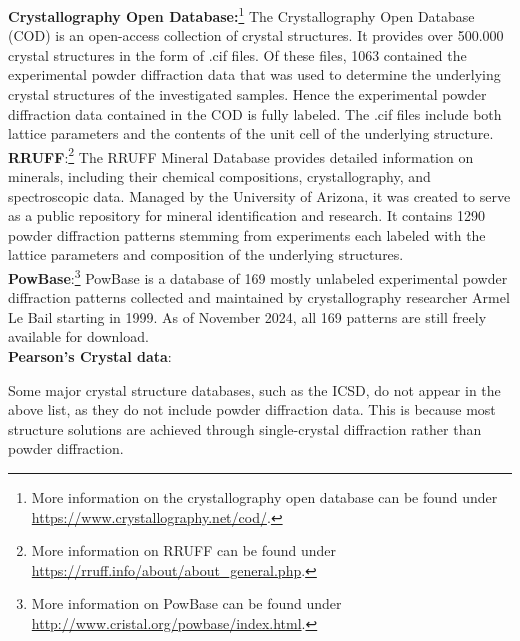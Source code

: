 \textbf{Crystallography Open Database:}\footnote{More information on the crystallography open database can be found under \url{https://www.crystallography.net/cod/}.} The Crystallography Open Database (COD)\cite{Graulis2009cod} is an open-access collection of crystal structures. It provides over 500.000 crystal structures in the form of .cif files. Of these files, 1063 contained the experimental powder diffraction data that was used to determine the underlying crystal structures of the investigated samples. Hence the experimental powder diffraction data contained in the COD is fully labeled. The .cif files include both lattice parameters and the contents of the unit cell of the underlying structure. \\

\textbf{RRUFF}:\footnote{More information on RRUFF can be found under \url{https://rruff.info/about/about_general.php}.} The RRUFF Mineral Database \cite{Armbruster2015} provides detailed information on minerals, including their chemical compositions, crystallography, and spectroscopic data. Managed by the University of Arizona, it was created to serve as a public repository for mineral identification and research. It contains \num{1290} powder diffraction patterns stemming from experiments each labeled with the lattice parameters and composition of the underlying structures. \\

\textbf{PowBase}:\footnote{More information on PowBase can be found under \url{http://www.cristal.org/powbase/index.html}.} PowBase is a database of 169 mostly unlabeled experimental powder diffraction patterns collected and maintained by crystallography researcher Armel Le Bail starting in 1999. As of November 2024, all 169 patterns are still freely available for download. \\


\textbf{Pearson's Crystal data}:

Some major crystal structure databases, such as the ICSD, do not appear in the above list, as they do not include powder diffraction data. This is because most structure solutions are achieved through single-crystal diffraction rather than powder diffraction.
 
